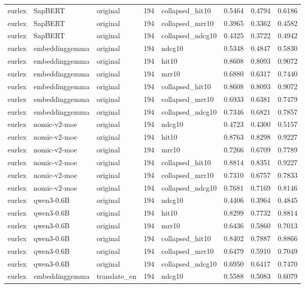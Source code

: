 \begin{tabular}{lllrlrrr}
eurlex & SapBERT & original & 194 & collapsed\_hit10 & 0.5464 & 0.4794 & 0.6186 \\
eurlex & SapBERT & original & 194 & collapsed\_mrr10 & 0.3965 & 0.3362 & 0.4582 \\
eurlex & SapBERT & original & 194 & collapsed\_ndcg10 & 0.4325 & 0.3722 & 0.4942 \\
eurlex & embeddinggemma & original & 194 & ndcg10 & 0.5348 & 0.4847 & 0.5830 \\
eurlex & embeddinggemma & original & 194 & hit10 & 0.8608 & 0.8093 & 0.9072 \\
eurlex & embeddinggemma & original & 194 & mrr10 & 0.6880 & 0.6317 & 0.7440 \\
eurlex & embeddinggemma & original & 194 & collapsed\_hit10 & 0.8608 & 0.8093 & 0.9072 \\
eurlex & embeddinggemma & original & 194 & collapsed\_mrr10 & 0.6933 & 0.6381 & 0.7479 \\
eurlex & embeddinggemma & original & 194 & collapsed\_ndcg10 & 0.7346 & 0.6821 & 0.7857 \\
eurlex & nomic-v2-moe & original & 194 & ndcg10 & 0.4723 & 0.4300 & 0.5157 \\
eurlex & nomic-v2-moe & original & 194 & hit10 & 0.8763 & 0.8298 & 0.9227 \\
eurlex & nomic-v2-moe & original & 194 & mrr10 & 0.7266 & 0.6709 & 0.7789 \\
eurlex & nomic-v2-moe & original & 194 & collapsed\_hit10 & 0.8814 & 0.8351 & 0.9227 \\
eurlex & nomic-v2-moe & original & 194 & collapsed\_mrr10 & 0.7310 & 0.6757 & 0.7833 \\
eurlex & nomic-v2-moe & original & 194 & collapsed\_ndcg10 & 0.7681 & 0.7169 & 0.8146 \\
eurlex & qwen3-0.6B & original & 194 & ndcg10 & 0.4406 & 0.3964 & 0.4845 \\
eurlex & qwen3-0.6B & original & 194 & hit10 & 0.8299 & 0.7732 & 0.8814 \\
eurlex & qwen3-0.6B & original & 194 & mrr10 & 0.6436 & 0.5860 & 0.7013 \\
eurlex & qwen3-0.6B & original & 194 & collapsed\_hit10 & 0.8402 & 0.7887 & 0.8866 \\
eurlex & qwen3-0.6B & original & 194 & collapsed\_mrr10 & 0.6479 & 0.5910 & 0.7049 \\
eurlex & qwen3-0.6B & original & 194 & collapsed\_ndcg10 & 0.6950 & 0.6417 & 0.7470 \\
eurlex & embeddinggemma & translate\_en & 194 & ndcg10 & 0.5588 & 0.5083 & 0.6079 \\

\end{tabular}
